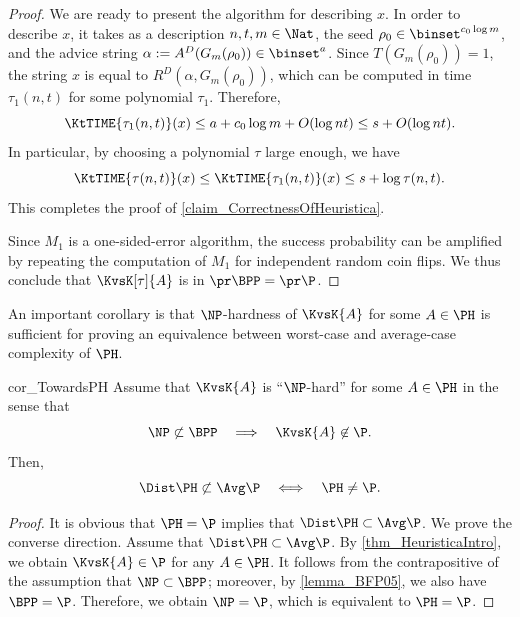 \documentclass{toc}
\begin{document}
\begin{proof}
  We are ready to present the algorithm for describing $x$.
  In order to describe $x$, it takes as a description
  $n, t, m \in \Nat$,
  the seed $\rho_0 \in \binset^{c_0 \log m}$,
  and
  the advice string $\alpha := A^D(G_m(\rho_0)) \in \binset^a$.
  Since $T(G_m(\rho_0)) = 1$,
  the string $x$ is equal to $R^D(\alpha, G_m(\rho_0))$,
  which can be computed in time $\tau_1(n, t)$ for some polynomial $\tau_1$.
  Therefore,
  $$
    \KtTIME{\tau_1(n, t)}(x) \le a + c_0 \log m + O(\log n t) \le s + O(\log n t).
  $$
  In particular, by choosing a polynomial $\tau$ large enough, we have
  $$\KtTIME{\tau(n, t)}(x) \le \KtTIME{\tau_1(n, t)}(x) \le s + \log \tau(n, t).$$
  This completes the proof of \cref{claim_CorrectnessOfHeuristica}.

  Since $M_1$ is a one-sided-error algorithm, the success probability can be amplified by repeating the computation of $M_1$
  for independent random coin flips.
  We thus conclude that $\KvsK[\tau]{A}$ is in $\pr\BPP = \pr\P$.
\end{proof}

An important corollary is that $\NP$-hardness of $\KvsK{A}$ for some $A \in \PH$
is sufficient for proving an equivalence between worst-case and average-case complexity of $\PH$.
\begin{restatetheorem}
  {cor_TowardsPH}
  Assume that $\KvsK{A}$ is ``$\NP$-hard'' for some $A \in \PH$
  in the sense that
  $$
    \NP \not\subset \BPP
    \quad
    \Longrightarrow
    \quad
    \KvsK{A} \not\in \P.
  $$
  Then,
  $$
    \Dist\PH \not\subset \Avg\P
    \quad
    \Longleftrightarrow
    \quad
    \PH \neq \P.
  $$
\end{restatetheorem}
\begin{proof}
  It is obvious that $\PH = \P$ implies that $\Dist\PH \subset \Avg\P$.
  We prove the converse direction.
  Assume that $\Dist\PH \subset \Avg\P$.
  By \cref{thm_HeuristicaIntro},
  we obtain
  $\KvsK{A} \in \P$
  for any $A \in \PH$.
  It follows from the contrapositive of the assumption that
  $\NP \subset \BPP$;
  moreover, by \cref{lemma_BFP05}, we also have $\BPP = \P$.
  Therefore, we obtain $\NP = \P$, which is equivalent to $\PH = \P$.
\end{proof}
\end{document}
